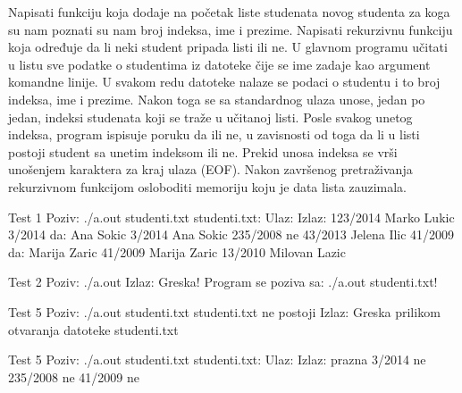 \begin{Exercise}[label=609]
Napisati funkciju koja dodaje na početak liste studenata novog studenta za koga su nam poznati su nam broj indeksa, ime
i prezime. 
Napisati rekurzivnu funkciju koja određuje da li neki student pripada listi ili ne.
U glavnom programu učitati u listu sve podatke o studentima iz datoteke čije se ime zadaje kao argument komandne linije. U svakom redu datoteke nalaze se podaci o studentu i to broj indeksa, ime
i prezime.
Nakon toga se sa standardnog ulaza unose, jedan po jedan, indeksi studenata koji se traže u učitanoj listi. Posle svakog unetog indeksa, program ispisuje poruku da ili ne,
u zavisnosti od toga da li u listi postoji student sa unetim indeksom ili ne. Prekid unosa indeksa se vrši unošenjem karaktera za kraj ulaza (EOF).
Nakon završenog pretraživanja rekurzivnom funkcijom osloboditi memoriju koju je data lista zauzimala.
\begin{maxitest}
\begin{test}{Test 1}
Poziv: ./a.out studenti.txt
studenti.txt:             Ulaz:       Izlaz:
123/2014 Marko Lukic      3/2014      da: Ana Sokic
3/2014 Ana Sokic          235/2008    ne
43/2013 Jelena Ilic       41/2009     da: Marija Zaric
41/2009 Marija Zaric
13/2010 Milovan Lazic
\end{test}
\begin{test}{Test 2}
Poziv: ./a.out
Izlaz: 
  Greska! Program se poziva sa: ./a.out studenti.txt!
\end{test}
\begin{test}{Test 5}
Poziv: ./a.out  studenti.txt
studenti.txt ne postoji
Izlaz: 
  Greska prilikom otvaranja datoteke studenti.txt
\end{test}
\begin{test}{Test 5}
Poziv: ./a.out  studenti.txt
studenti.txt:             Ulaz:       Izlaz:
  prazna                  3/2014      ne
                          235/2008    ne
                          41/2009     ne
\end{test}
\end{maxitest}
\end{Exercise}
\begin{Answer}[ref=609]
\end{Answer}

